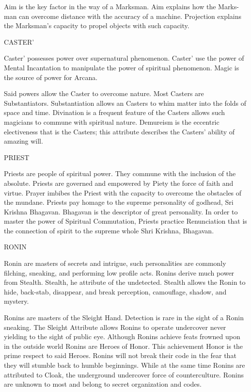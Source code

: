 \documentclass{article}
\begin{document}
	Aim is the key factor in the way of a Marksman. Aim explains how the Marks- man can
overcome distance with the accuracy of a machine. Projection explains the Marksman’s capacity
to propel objects with such capacity.

CASTER’

	Caster’ possesses power over supernatural phenomenon. Caster’ use the power of Mental
Incantation to manipulate the power of spiritual phenomenon. Magic is the source of power for
Arcana.

	Said powers allow the Caster to overcome nature. Most Casters are Substantiators. Substantiation
allows an Casters to whim matter into the folds of space and time. Divination is a frequent
feature of the Casters allows such magicians to commune with spiritual nature. Demureism is the
eccentric electiveness that is the Casters; this attribute describes the Casters’ ability of amazing
will.

PRIEST

Priests are people of spiritual power. They commune with the inclusion of the absolute.
Priests are governed and empowered by Piety the force of faith and virtue. Prayer imbibes the
Priest with the capacity to overcome the obstacles of the mundane. Priests pay homage to the
supreme personality of godhead, Sri Krishna Bhagavan. Bhagavan is the descriptor of great
personality. In order to master the power of Spiritual Commutation, Priests practice Renunciation
that is the connection of spirit to the supreme whole Shri Krishna, Bhagavan.

RONIN

	Ronin are masters of secrets and intrigue, such personalities are commonly filching, sneaking,
and performing low profile acts. Ronins derive much power from Stealth.
Stealth, he attribute of the undetected. Stealth allows the Ronin to hide, back-stab, disappear, and
break perception, camouflage, shadow, and mystery.

	Ronins are masters of the Sleight Hand. Detection is rare in the sight of a Ronin sneaking. The
Sleight Attribute allows Ronins to operate undercover never yielding to the sight of public eye.
Although Ronins achieve feats frowned upon in the outside world Ronins are Heroes of Honor.
This achievement Honor is the prime respect to said Heroes. Ronins will not break their code in
the fear that they will stumble back to humble beginnings. While at the same time Ronins are
attributed to Cloak, the underground undercover force of counterculture. Ronins are unknown to
most and belong to secret organization and codes.
\end{document}
